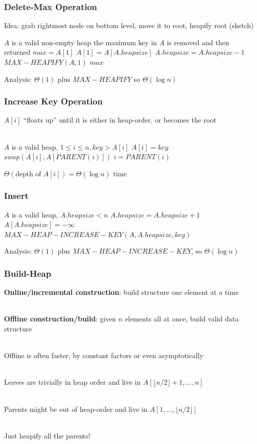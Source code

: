\documentclass{beamer}
\newcommand{\stanza}{ \\~\ }
\begin{document}
\begin{frame} \frametitle{Delete-Max Operation}

Idea: grab rightmost node on bottom level, move it to root, heapify root (sketch)

\begin{algorithmic}[1]
  \Require $A$ is a valid non-empty heap
  \Ensure the maximum key in $A$ is removed and then returned
  \State $max = A[1]$
  \State $A[1] = A[A.heapsize]$
  \State $A.heapsize = A.heapsize - 1$
  \State $MAX-HEAPIFY(A, 1)$
  \State \Return $max$
  \EndFunction
\end{algorithmic}

Analysis: $\Theta(1)$ plus $MAX-HEAPIFY$ so $\Theta(\log n)$
\end{frame}


\begin{frame} \frametitle{Increase Key Operation}
$A[i]$ ``floats up'' until it is either in heap-order, or becomes the root \stanza

\begin{algorithmic}[1]
  \Require $A$ is a valid heap, $1 \leq i \leq n, key > A[i]$
  \State $A[i] = key$
    \State $swap(A[i], A[PARENT(i)])$
    \State $i = PARENT(i)$
  \EndWhile
  \EndFunction
\end{algorithmic}

$\Theta(\text{depth of } A[i]) = \Theta(\log n)$ time

\end{frame}

\begin{frame} \frametitle{Insert}
\begin{algorithmic}[1]
  \Require $A$ is a valid heap, $A.heapsize < n$
  \State $A.heapsize = A.heapsize + 1$
  \State $A[A.heapsize] = - \infty$
  \State $MAX-HEAP-INCREASE-KEY(A, A.heapsize, key)$
  \EndFunction
\end{algorithmic}

Analysis: $\Theta(1)$ plus $MAX-HEAP-INCREASE-KEY$, so $\Theta(\log n)$
\end{frame}

\begin{frame} \frametitle{Build-Heap}
\textbf{Online/incremental construction}: build structure one element at a time \stanza

\textbf{Offline construction/build}: given $n$ elements all at once, build valid data structure \stanza

Offline is often faster, by constant factors or even asymptotically \stanza

Leaves are trivially in heap order and live in $A[\lfloor n/2 \rfloor+1, \ldots, n]$ \stanza

Parents might be out of heap-order and live in $A[1, \ldots, \lfloor n/2 \rfloor]$ \stanza

Just heapify all the parents! \stanza
\end{frame}
\end{document}
